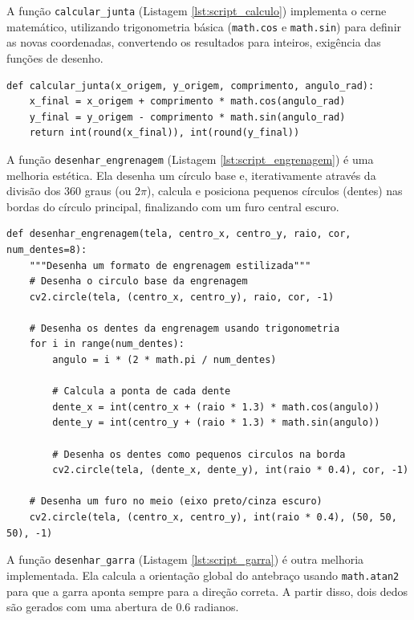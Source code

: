 \documentclass{article}
\begin{document}
A função \texttt{calcular\_junta} (Listagem \ref{lst:script_calculo}) implementa o cerne matemático, utilizando trigonometria básica (\texttt{math.cos} e \texttt{math.sin}) para definir as novas coordenadas, convertendo os resultados para inteiros, exigência das funções de desenho.

\begin{lstlisting}[style=pythonstyle, caption={Cálculo cinemático das juntas do braço robótico}, label={lst:script_calculo}]
def calcular_junta(x_origem, y_origem, comprimento, angulo_rad):
    x_final = x_origem + comprimento * math.cos(angulo_rad)
    y_final = y_origem - comprimento * math.sin(angulo_rad)
    return int(round(x_final)), int(round(y_final))
\end{lstlisting}

A função \texttt{desenhar\_engrenagem} (Listagem \ref{lst:script_engrenagem}) é uma melhoria estética. Ela desenha um círculo base e, iterativamente através da divisão dos 360 graus (ou $2\pi$), calcula e posiciona pequenos círculos (dentes) nas bordas do círculo principal, finalizando com um furo central escuro.

\begin{lstlisting}[style=pythonstyle, caption={Função estilizada para desenho de engrenagens utilizando aproximações trigonométricas}, label={lst:script_engrenagem}]
def desenhar_engrenagem(tela, centro_x, centro_y, raio, cor, num_dentes=8):
    """Desenha um formato de engrenagem estilizada"""
    # Desenha o circulo base da engrenagem
    cv2.circle(tela, (centro_x, centro_y), raio, cor, -1)
    
    # Desenha os dentes da engrenagem usando trigonometria
    for i in range(num_dentes):
        angulo = i * (2 * math.pi / num_dentes)
        
        # Calcula a ponta de cada dente
        dente_x = int(centro_x + (raio * 1.3) * math.cos(angulo))
        dente_y = int(centro_y + (raio * 1.3) * math.sin(angulo))
        
        # Desenha os dentes como pequenos circulos na borda
        cv2.circle(tela, (dente_x, dente_y), int(raio * 0.4), cor, -1)
        
    # Desenha um furo no meio (eixo preto/cinza escuro)
    cv2.circle(tela, (centro_x, centro_y), int(raio * 0.4), (50, 50, 50), -1)
\end{lstlisting}

A função \texttt{desenhar\_garra} (Listagem \ref{lst:script_garra}) é outra melhoria implementada. Ela calcula a orientação global do antebraço usando \texttt{math.atan2} para que a garra aponta sempre para a direção correta. A partir disso, dois dedos são gerados com uma abertura de $0.6$ radianos.
\end{document}
